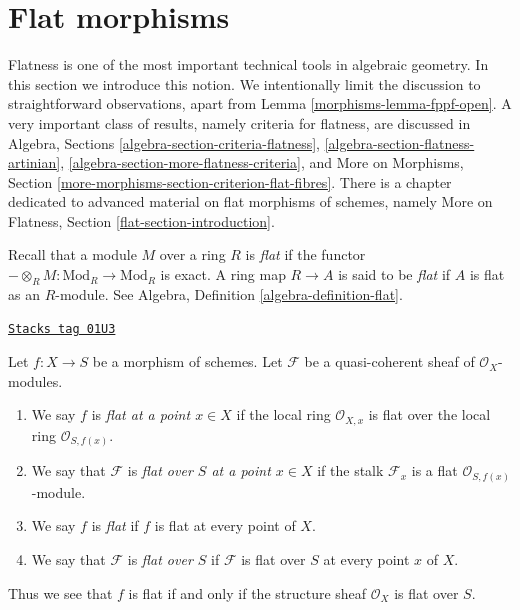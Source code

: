 \section{Flat morphisms}
\label{morphisms-section-flat}
Flatness is one of the most important technical tools in algebraic geometry.
In this section we introduce this notion. We intentionally limit the discussion
to straightforward observations, apart from Lemma \ref{morphisms-lemma-fppf-open}.
A very important class of results, namely criteria for flatness, are
discussed in
Algebra, Sections \ref{algebra-section-criteria-flatness},
\ref{algebra-section-flatness-artinian},
\ref{algebra-section-more-flatness-criteria}, and
More on Morphisms, Section
\ref{more-morphisms-section-criterion-flat-fibres}.
There is a chapter dedicated to advanced material on flat morphisms of
schemes, namely More on Flatness, Section \ref{flat-section-introduction}.

\medskip\noindent
Recall that a module $M$ over a ring $R$ is {\it flat} if the functor
$-\otimes_R M : \text{Mod}_R \to \text{Mod}_R$ is exact. A ring map
$R \to A$ is said to be {\it flat} if $A$ is flat as an $R$-module.
See
Algebra, Definition \ref{algebra-definition-flat}.

\begin{definition}[Flat]
\label{morphisms-definition-flat}
\href{https://stacks.math.columbia.edu/tag/01U3}{\texttt{Stacks tag 01U3}}

Let $f : X \to S$ be a morphism of schemes.
Let $\mathcal{F}$ be a quasi-coherent sheaf of $\mathcal{O}_X$-modules.
\begin{enumerate}
\item We say $f$ is {\it flat at a point $x \in X$} if the
local ring $\mathcal{O}_{X, x}$ is flat over the local ring
$\mathcal{O}_{S, f(x)}$.
\item We say that $\mathcal{F}$ is {\it flat over $S$ at a point $x \in X$}
if the stalk $\mathcal{F}_x$ is a flat $\mathcal{O}_{S, f(x)}$-module.
\item We say $f$ is {\it flat} if $f$ is flat at every point of $X$.
\item We say that $\mathcal{F}$ is {\it flat over $S$} if
$\mathcal{F}$ is flat over $S$ at every point $x$ of $X$.
\end{enumerate}
\end{definition}

Thus we see that $f$ is flat if and only if
the structure sheaf $\mathcal{O}_X$ is flat over $S$.

